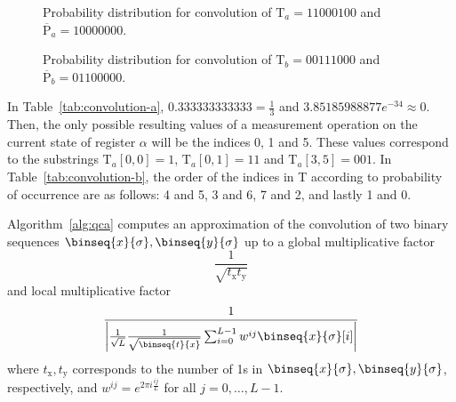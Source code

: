 \begin{example}
	\begin{figure}
		\centering
		\caption{Probability distribution for convolution of $\text{T}_a = 11000100$ and $\overline{\text{P}}_a = 10000000$.}
		\label{fig:convolution-a}
	\end{figure}
	\begin{figure}
			\centering
			\caption{Probability distribution for convolution of $\text{T}_b = 00111000$ and $\overline{\text{P}}_b = 01100000$.}
			\label{fig:convolution-b}
		\end{figure}
	
In Table~\ref{tab:convolution-a}, $0.333333333333 = \frac{1}{3}$ and $3.85185988877e^{-34} \approx 0$. Then, the only possible resulting values of a measurement operation on the current state of register $\alpha$ will be the indices 0, 1 and 5. These values correspond to the substrings $\text{T}_a[0, 0] = 1$, $\text{T}_a[0,1] = 11$ and $\text{T}_a[3,5] = 001$. In Table~\ref{tab:convolution-b}, the order of the indices in T according to probability of occurrence are as follows: 4 and 5, 3 and 6, 7 and 2, and lastly 1 and 0.
\end{example}

\begin{lemma}\label{lem:quantum-convolution-approximate}
	Algorithm~\ref{alg:qca} computes an approximation of the convolution of two binary sequences $\binseq{x}{\sigma}, \binseq{y}{\sigma}$ up to a global multiplicative factor
	\[
		\frac{1}{\sqrt{t_{\mathrm{x}}t_{\mathrm{y}}}}
	\]
and local multiplicative factor
	\[
		\frac{1}{\left\vert \frac{1}{\sqrt{L}}\frac{1}{\sqrt{\binseq{t}{x}}} \sum_{i=0}^{L-1} w^{ij}\binseq{x}{\sigma}[i] \right\vert}
	\]
where $t_{\mathrm{x}}, t_{\mathrm{y}}$ corresponds to the number of 1s in $\binseq{x}{\sigma}, \binseq{y}{\sigma}$, respectively, and $w^{ij}=e^{2\pi i \frac{ij}{L} }$ for all $j=0,\ldots,L-1$.
\end{lemma}

